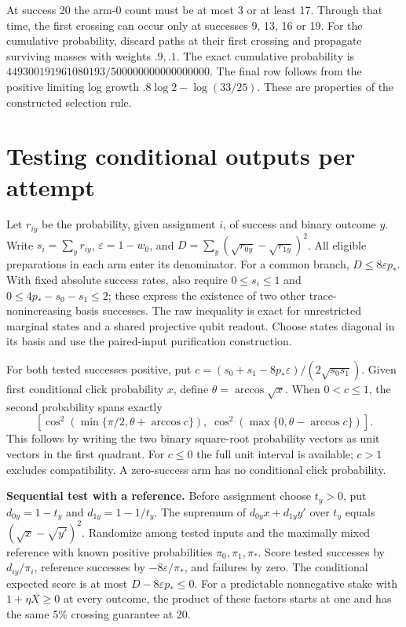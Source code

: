 \documentclass[
  10pt,
  a4paper,
]{article}
\begin{document}
At success 20 the arm-0 count must be at most 3 or at least 17. Through that time, the first crossing can occur only at successes 9, 13, 16 or 19. For the cumulative probability, discard paths at their first crossing and propagate surviving masses with weights \(.9,.1\). The exact cumulative probability is \(449300191961080193/500000000000000000\). The final row follows from the positive limiting log growth \(.8\log 2-\log(33/25)\). These are properties of the constructed selection rule.

\newpage

\section{Testing conditional outputs per attempt}\label{testing-conditional-outputs-per-attempt}

Let \(r_{iy}\) be the probability, given assignment \(i\), of success and binary outcome \(y\). Write \(s_i=\sum_y r_{iy}\), \(\varepsilon=1-w_0\), and \(D=\sum_y(\sqrt{r_{0y}}-\sqrt{r_{1y}})^2\). All eligible preparations in each arm enter its denominator. For a common branch, \(D\le8\varepsilon p_*\). With fixed absolute success rates, also require \(0\le s_i\le1\) and \(0\le4p_*-s_0-s_1\le2\); these express the existence of two other trace-nonincreasing basis successes. The raw inequality is exact for unrestricted marginal states and a shared projective qubit readout. Choose states diagonal in its basis and use the paired-input purification construction.

For both tested successes positive, put \(c=(s_0+s_1-8p_*\varepsilon)/(2\sqrt{s_0s_1})\). Given first conditional click probability \(x\), define \(\theta=\arccos\sqrt{x}\). When \(0<c\le1\), the second probability spans exactly \[
 [\cos^2(\min\{\pi/2,\theta+\arccos c\}),\;
  \cos^2(\max\{0,\theta-\arccos c\})].
\] This follows by writing the two binary square-root probability vectors as unit vectors in the first quadrant. For \(c\le0\) the full unit interval is available; \(c>1\) excludes compatibility. A zero-success arm has no conditional click probability.

\textbf{Sequential test with a reference.} Before assignment choose \(t_y>0\), put \(d_{0y}=1-t_y\) and \(d_{1y}=1-1/t_y\). The supremum of \(d_{0y}x+d_{1y}y'\) over \(t_y\) equals \((\sqrt{x}-\sqrt{y'})^2\). Randomize among tested inputs and the maximally mixed reference with known positive probabilities \(\pi_0,\pi_1,\pi_*\). Score tested successes by \(d_{iy}/\pi_i\), reference successes by \(-8\varepsilon/\pi_*\), and failures by zero. The conditional expected score is at most \(D-8\varepsilon p_*\le0\). For a predictable nonnegative stake with \(1+\eta X\ge0\) at every outcome, the product of these factors starts at one and has the same 5\% crossing guarantee at 20.
\end{document}
